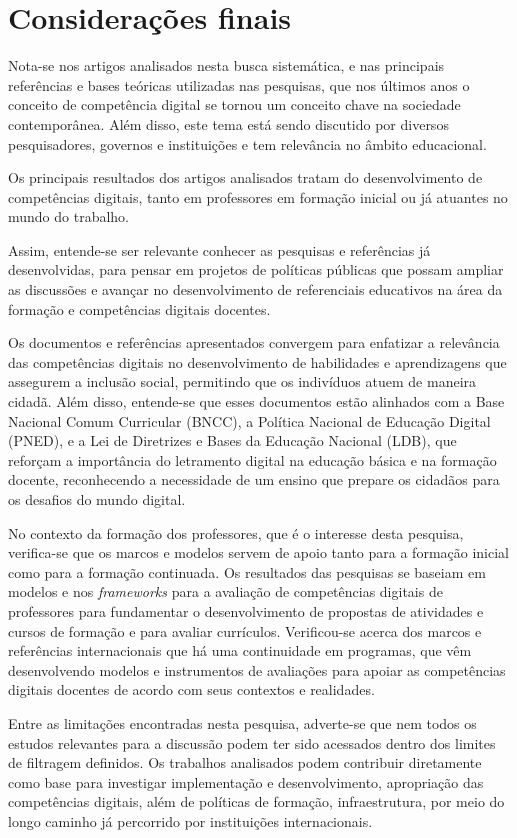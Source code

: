 \documentclass[portuguese]{textolivre}
\begin{document}
\section{Considerações finais}
Nota-se nos artigos analisados nesta busca sistemática, e nas principais
referências e bases teóricas utilizadas nas pesquisas, que nos últimos
anos o conceito de competência digital se tornou um conceito chave na
sociedade contemporânea. Além disso, este tema está sendo discutido por
diversos pesquisadores, governos e instituições e tem relevância no
âmbito educacional.

Os principais resultados dos artigos analisados tratam do
desenvolvimento de competências digitais, tanto em professores em
formação inicial ou já atuantes no mundo do trabalho.

Assim, entende-se ser relevante conhecer as pesquisas e referências já
desenvolvidas, para pensar em projetos de políticas públicas que possam
ampliar as discussões e avançar no desenvolvimento de referenciais
educativos na área da formação e competências digitais docentes.

Os documentos e referências apresentados convergem para enfatizar a
relevância das competências digitais no desenvolvimento de habilidades e
aprendizagens que assegurem a inclusão social, permitindo que os
indivíduos atuem de maneira cidadã. Além disso, entende-se que esses
documentos estão alinhados com a Base Nacional Comum Curricular (BNCC),
a Política Nacional de Educação Digital (PNED), e a Lei de Diretrizes e
Bases da Educação Nacional (LDB), que reforçam a importância do
letramento digital na educação básica e na formação docente,
reconhecendo a necessidade de um ensino que prepare os cidadãos para os
desafios do \textquotesingle mundo\textquotesingle{} digital.

No contexto da formação dos professores, que é o interesse desta
pesquisa, verifica-se que os marcos e modelos servem de apoio tanto para
a formação inicial como para a formação continuada. Os resultados das
pesquisas se baseiam em modelos e nos \emph{frameworks} para a avaliação
de competências digitais de professores para fundamentar o
desenvolvimento de propostas de atividades e cursos de formação e para
avaliar currículos. Verificou-se acerca dos marcos e referências
internacionais que há uma continuidade em programas, que vêm
desenvolvendo modelos e instrumentos de avaliações para apoiar as
competências digitais docentes de acordo com seus contextos e
realidades.

Entre as limitações encontradas nesta pesquisa, adverte-se que nem todos
os estudos relevantes para a discussão podem ter sido acessados dentro
dos limites de filtragem definidos. Os trabalhos analisados podem
contribuir diretamente como base para investigar implementação e
desenvolvimento, apropriação das competências digitais, além de
políticas de formação, infraestrutura, por meio do longo caminho já
percorrido por instituições internacionais.
\end{document}
